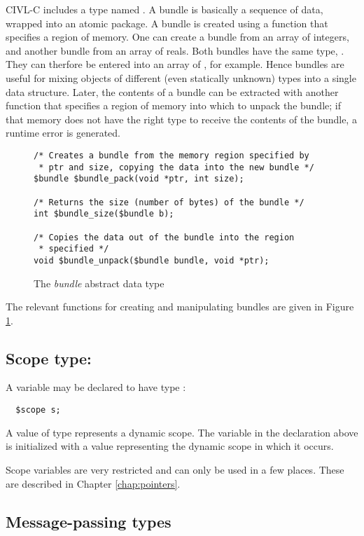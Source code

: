 CIVL-C includes a type named \cbundle. A bundle is basically a
sequence of data, wrapped into an atomic package. A bundle is created
using a function that specifies a region of memory. One can create a
bundle from an array of integers, and another bundle from an array of
reals. Both bundles have the same type, \cbundle. They can therfore be
entered into an array of \cbundle, for example. Hence bundles are
useful for mixing objects of different (even statically unknown) types
into a single data structure. Later, the contents of a bundle can be
extracted with another function that specifies a region of memory into
which to unpack the bundle; if that memory does not have the right
type to receive the contents of the bundle, a runtime error is
generated.

\begin{figure}
\begin{verbatim}
/* Creates a bundle from the memory region specified by
 * ptr and size, copying the data into the new bundle */
$bundle $bundle_pack(void *ptr, int size);

/* Returns the size (number of bytes) of the bundle */
int $bundle_size($bundle b);

/* Copies the data out of the bundle into the region
 * specified */
void $bundle_unpack($bundle bundle, void *ptr);
\end{verbatim}
  \caption{The \emph{bundle} abstract data type}
  \label{fig:bundle}
\end{figure}

The relevant functions for creating and manipulating bundles
are given in Figure \ref{fig:bundle}.

\subsection{Scope type: \cscope}

A variable may be declared to have type \cscope:
\begin{verbatim}
  $scope s;
\end{verbatim}
A value of type \cscope{} represents a dynamic scope. The variable
 in the declaration above is initialized with a value
representing the dynamic scope in which it occurs.

Scope variables are very restricted and can only be used in a few
places. These are described in Chapter \ref{chap:pointers}.


\subsection{Message-passing types}

